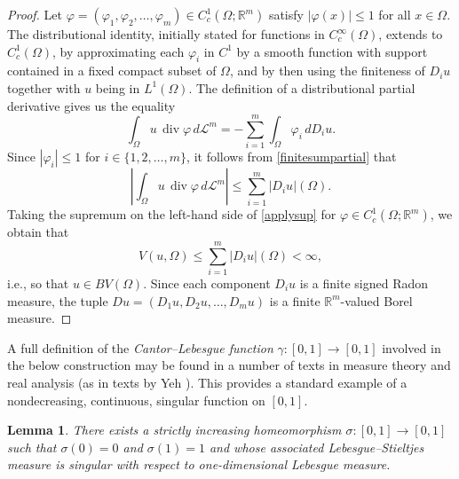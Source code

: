 \documentclass{publicadapt}
\newtheorem{lemma}{Lemma}%
\begin{document}
\begin{proof}
Let $\varphi = (\varphi_1,\varphi_2, \ldots, \varphi_m)\in C_c^1(\Omega;\mathbb R^m)$
satisfy \(|\varphi(x)|\leq 1\) for all \(x\in\Omega\). 
 The distributional identity, initially stated for
 functions in \(C_c^\infty(\Omega)\), extends to \(C_c^1(\Omega)\), by approximating 
 each $\varphi_i$ in $C^1$ by a smooth function with support contained in a
 fixed compact subset of \(\Omega\), and by then using
 the finiteness of $D_i u$ together with $u$ being in $ L^1(\Omega)$. 
 The definition of a distributional partial derivative gives us the equality 
\begin{equation}\label{finitesumpartial}
\int_\Omega u\,\operatorname{div}\varphi\,d\mathcal L^m
=
-\sum_{i=1}^m \int_\Omega \varphi_i\,dD_i u. 
\end{equation} 
 Since \(|\varphi_i|\leq 1\) for $i \in \{ 1, 2, \ldots, m \}$, it follows from \eqref{finitesumpartial} that
\begin{equation}\label{applysup}
\left|
\int_\Omega u\,\operatorname{div}\varphi\,d\mathcal L^m
\right|
\leq
\sum_{i=1}^m |D_i u|(\Omega).
\end{equation}
 Taking the supremum on the left-hand side of \eqref{applysup}
 for $\varphi \in C_c^1(\Omega;\mathbb R^m)$, 
 we obtain that 
$$
V(u,\Omega)\leq \sum_{i=1}^m |D_i u|(\Omega)<\infty, 
$$
 i.e., so that $u \in BV(\Omega)$. Since each component \(D_i u\) is a finite signed
 Radon measure, the tuple $Du = (D_1u, D_2u, \ldots,D_mu)$ is a finite
\(\mathbb R^m\)-valued Borel measure.
\end{proof}

 A full definition of the \emph{Cantor--Lebesgue function} \(\gamma:[0,1]\to[0,1]\)
 involved in the below construction may be found in a number of texts in measure theory and real analysis
 (as in texts by Yeh \cite[pp.\ 76--77]{Yeh2000}
 \cite[pp. 87--88]{Yeh2006}). 
 This provides a standard example of a nondecreasing, continuous, singular function on $[0, 1]$.

\begin{lemma}\label{lemmasigma}%
There exists a strictly increasing homeomorphism $ \sigma:[0,1]\to[0,1]$
 such that 
$\sigma(0)=0$ and $\sigma(1)=1$ and 
 whose associated Lebesgue--Stieltjes measure is singular with respect to
one-dimensional Lebesgue measure.
\end{lemma}
\end{document}
